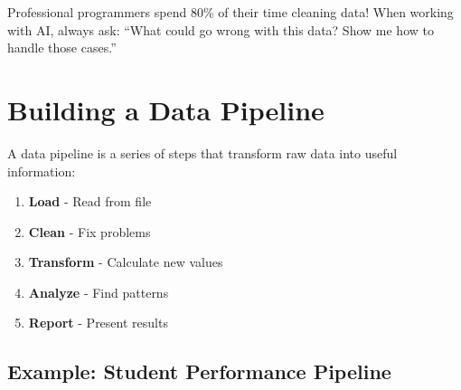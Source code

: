 \documentclass[
  letterpaper,
  DIV=11,
  numbers=noendperiod,
  oneside]{scrreprt}
\providecommand{\tightlist}{%
  \setlength{\itemsep}{0pt}\setlength{\parskip}{0pt}}\usepackage{longtable,booktabs,array}
\begin{document}
\begin{tcolorbox}[enhanced jigsaw, opacityback=0, colback=white, colframe=quarto-callout-important-color-frame, breakable, titlerule=0mm, coltitle=black, rightrule=.15mm, colbacktitle=quarto-callout-important-color!10!white, left=2mm, bottomtitle=1mm, bottomrule=.15mm, title=\textcolor{quarto-callout-important-color}{\faExclamation}\hspace{0.5em}{Data Cleaning Reality}, opacitybacktitle=0.6, toptitle=1mm, leftrule=.75mm, arc=.35mm, toprule=.15mm]

Professional programmers spend 80\% of their time cleaning data! When
working with AI, always ask: ``What could go wrong with this data? Show
me how to handle those cases.''

\end{tcolorbox}

\section{Building a Data Pipeline}\label{building-a-data-pipeline}

A data pipeline is a series of steps that transform raw data into useful
information:

\begin{enumerate}
\def\labelenumi{\arabic{enumi}.}
\tightlist
\item
  \textbf{Load} - Read from file
\item
  \textbf{Clean} - Fix problems
\item
  \textbf{Transform} - Calculate new values
\item
  \textbf{Analyze} - Find patterns
\item
  \textbf{Report} - Present results
\end{enumerate}

\subsection{Example: Student Performance
Pipeline}\label{example-student-performance-pipeline}
\end{document}
